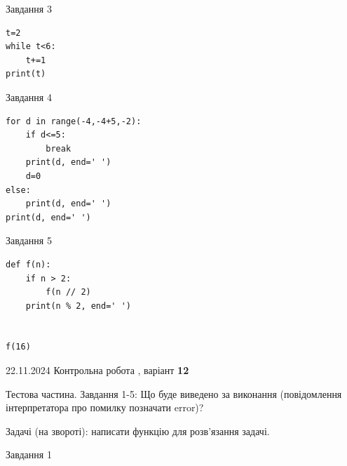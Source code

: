 \documentclass[12pt, ukrainian]{article}
\begin{document}
{{{{{{{{{{{\begin{minipage}[t]{8.5cm}
{\begin{center}Завдання {3}\end{center}}
\vspace{-6mm}

\begin{verbatim}
t=2
while t<6:
    t+=1
print(t)
\end{verbatim}


\end{minipage}
\vline \hspace{6mm}
\begin{minipage}[t]{10.7cm}
               
{\begin{center}Завдання {4}\end{center}}
\vspace{-6mm}

\begin{verbatim}
for d in range(-4,-4+5,-2):
    if d<=5:
        break
    print(d, end=' ')
    d=0
else:
    print(d, end=' ')
print(d, end=' ')
\end{verbatim}


\vspace{5mm}
               
{\begin{center}Завдання {5}\end{center}}
\vspace{-6mm}

\begin{verbatim}
def f(n):
    if n > 2:
        f(n // 2)
    print(n % 2, end=' ')
    

f(16)
\end{verbatim}


\end{minipage}

\newpage

{{22.11.2024 Контрольна робота , варіант  \No \textbf { 12 }\par}}
{

Тестова частина. Завдання 1-5: Що буде виведено за виконання (повідомлення інтерпретатора про помилку позначати error)?

Задачі (на звороті): написати функцію для розв'язання задачі.

\vspace{5mm} \begin{minipage}[t]{8.5cm}
               
{\begin{center}Завдання {1}\end{center}}
\vspace{-6mm}


\end{minipage}}}}}}}}}}}}}
\end{document}
